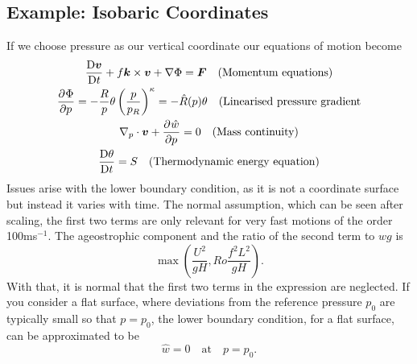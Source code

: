 \subsection{Example: Isobaric Coordinates} 
If we choose pressure as our vertical coordinate our equations of motion become 
\begin{gather*}
    \displaystyle \frac{{\rm D} \bm{v}}{{\rm D} t}+f\bm{k}\times\bm{v}+\nabla\Phi = \bm{F} \quad \text{(Momentum equations)}\\
    \displaystyle \frac{\partial^{} \Phi}{\partial p^{}}=-\frac{R}{p}\theta\left(\frac{p}{p_R}\right)^\kappa=-\hat{R}(p)\theta \quad\text{(Linearised pressure gradient}\\
    \nabla_p\cdot\bm{v}+\displaystyle \frac{\partial^{} \hat{w}}{\partial p^{}}=0 \quad\text{(Mass continuity)}\\
    \displaystyle \frac{{\rm D} \theta}{{\rm D} t}=S \quad\text{(Thermodynamic energy equation)} 
\end{gather*}
Issues arise with the lower boundary condition, as it is not a coordinate surface but instead it varies with time. The normal assumption, which can be seen after scaling, the first two terms are only relevant for very fast motions of the order 100ms$^{-1}$. The ageostrophic component and the ratio of the second term to $wg$ is $$\max\left(\frac{U^2}{gH},Ro\frac{f^2L^2}{gH}\right).$$ With that, it is normal that the first two terms in the expression are neglected. If you consider a flat surface, where deviations from the reference pressure $p_0$ are typically small so that $p=p_0$, the lower boundary condition, for a flat surface, can be approximated to be $$\hat{w}=0\quad\text{at}\quad p=p_0.$$
